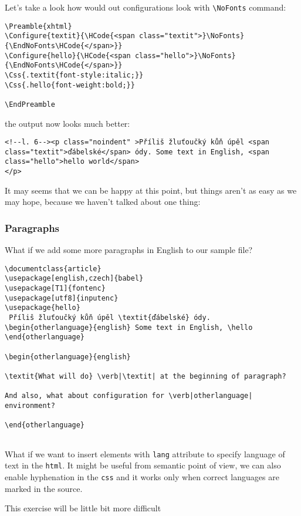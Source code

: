 Let's take a look how would out configurations look with
\texttt{\textbackslash{}NoFonts} command:

\begin{verbatim}
\Preamble{xhtml}
\Configure{textit}{\HCode{<span class="textit">}\NoFonts}
{\EndNoFonts\HCode{</span>}}
\Configure{hello}{\HCode{<span class="hello">}\NoFonts}
{\EndNoFonts\HCode{</span>}}
\Css{.textit{font-style:italic;}}
\Css{.hello{font-weight:bold;}}

\EndPreamble
\end{verbatim}

the output now looks much better:

\begin{verbatim}
<!--l. 6--><p class="noindent" >Příliš žluťoučký kůň úpěl <span class="textit">ďábelské</span> ódy. Some text in English, <span class="hello">hello world</span>
</p> 
\end{verbatim}

It may seems that we can be happy at this point, but things aren't as
easy as we may hope, because we haven't talked about one thing:

\hypertarget{paragraphs}{%
\subsubsection{Paragraphs}\label{paragraphs}}

What if we add some more paragraphs in English to our sample file?

\begin{verbatim}
\documentclass{article}
\usepackage[english,czech]{babel} 
\usepackage[T1]{fontenc}
\usepackage[utf8]{inputenc} 
\usepackage{hello}
 Příliš žluťoučký kůň úpěl \textit{ďábelské} ódy.
\begin{otherlanguage}{english} Some text in English, \hello
\end{otherlanguage} 

\begin{otherlanguage}{english} 

\textit{What will do} \verb|\textit| at the beginning of paragraph?

And also, what about configuration for \verb|otherlanguage| environment?

\end{otherlanguage}


\end{verbatim}

What if we want to insert elements with \texttt{lang} attribute to
specify language of text in the \texttt{html}. It might be useful from
semantic point of view, we can also enable hyphenation in the
\texttt{css} and it works only when correct languages are marked in the
source.

This exercise will be little bit more difficult

